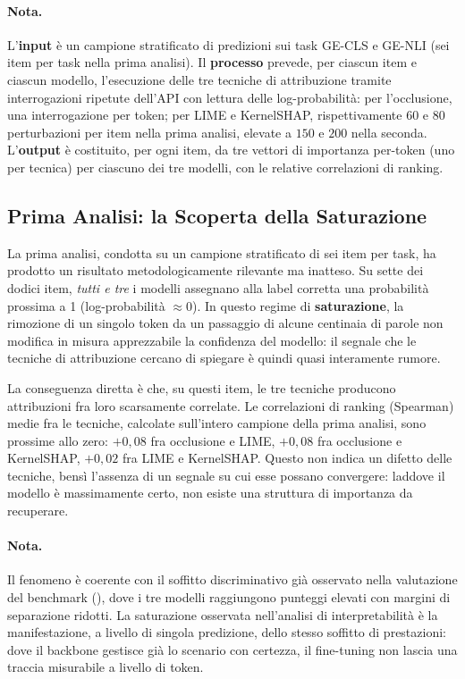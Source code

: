 \documentclass[pdflatex, sn-apa]{sn-jnl}%
\theoremstyle{thmstyleone}%
\theoremstyle{thmstyletwo}%
\theoremstyle{thmstylethree}%
\begin{document}
\paragraph{Nota.}
L'\textbf{input} è un campione stratificato di predizioni sui task GE-CLS e GE-NLI
(sei item per task nella prima analisi). Il \textbf{processo} prevede, per ciascun
item e ciascun modello, l'esecuzione delle tre tecniche di attribuzione tramite
interrogazioni ripetute dell'API con lettura delle log-probabilità: per
l'occlusione, una interrogazione per token; per LIME e KernelSHAP, rispettivamente
$60$ e $80$ perturbazioni per item nella prima analisi, elevate a $150$ e $200$
nella seconda. L'\textbf{output} è costituito, per ogni item, da tre vettori di
importanza per-token (uno per tecnica) per ciascuno dei tre modelli, con le
relative correlazioni di ranking.

\subsection{Prima Analisi: la Scoperta della Saturazione}
\label{sec:xai:saturation}

La prima analisi, condotta su un campione stratificato di sei item per task, ha
prodotto un risultato metodologicamente rilevante ma inatteso. Su sette dei dodici
item, \emph{tutti e tre} i modelli assegnano alla label corretta una probabilità
prossima a 1 (log-probabilità $\approx 0$). In questo regime di
\textbf{saturazione}, la rimozione di un singolo token da un passaggio di alcune
centinaia di parole non modifica in misura apprezzabile la confidenza del modello:
il segnale che le tecniche di attribuzione cercano di spiegare è quindi quasi
interamente rumore.

La conseguenza diretta è che, su questi item, le tre tecniche producono
attribuzioni fra loro scarsamente correlate. Le correlazioni di ranking (Spearman)
medie fra le tecniche, calcolate sull'intero campione della prima analisi, sono
prossime allo zero: $+0{,}08$ fra occlusione e LIME, $+0{,}08$ fra occlusione e
KernelSHAP, $+0{,}02$ fra LIME e KernelSHAP. Questo non indica un difetto delle
tecniche, bensì l'assenza di un segnale su cui esse possano convergere: laddove il
modello è massimamente certo, non esiste una struttura di importanza da recuperare.

\paragraph{Nota.}
Il fenomeno è coerente con il soffitto discriminativo già osservato nella
valutazione del benchmark (), dove i tre modelli raggiungono
punteggi elevati con margini di separazione ridotti. La saturazione osservata
nell'analisi di interpretabilità è la manifestazione, a livello di singola
predizione, dello stesso soffitto di prestazioni: dove il backbone gestisce già lo
scenario con certezza, il fine-tuning non lascia una traccia misurabile a livello
di token.
\end{document}

